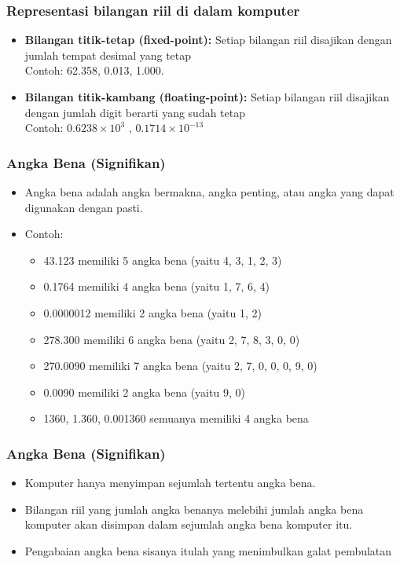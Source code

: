 \documentclass[pdflatex,compress]{beamer}
\begin{document}
\begin{frame}
	\frametitle{Representasi bilangan riil di dalam komputer}
	\begin{itemize}
		\item \textbf{Bilangan titik-tetap (fixed-point):} Setiap bilangan riil disajikan dengan jumlah tempat desimal yang tetap\\
		Contoh: 62.358, 0.013, 1.000.
		\item \textbf{Bilangan titik-kambang (floating-point):} Setiap bilangan riil disajikan dengan jumlah digit berarti yang sudah tetap\\
		Contoh: $0.6238 \times 10^3$ , $0.1714 \times 10^{-13}$
	\end{itemize}
\end{frame}

\begin{frame}
	\frametitle{Angka Bena (Signifikan)}
	\begin{itemize}
		\item Angka bena adalah angka bermakna, angka penting, atau angka yang dapat digunakan dengan pasti.
		\item Contoh:
		\begin{itemize}
			\item[] 43.123 memiliki 5 angka bena (yaitu 4, 3, 1, 2, 3)
			\item[]0.1764 memiliki 4 angka bena (yaitu 1, 7, 6, 4)
			\item[] 0.0000012 memiliki 2 angka bena (yaitu 1, 2)
			\item[] 278.300 memiliki 6 angka bena (yaitu 2, 7, 8, 3, 0, 0)
			\item[] 270.0090 memiliki 7 angka bena (yaitu 2, 7, 0, 0, 0, 9, 0)
			\item[] 0.0090 memiliki 2 angka bena (yaitu 9, 0)
			\item[] 1360, 1.360, 0.001360 semuanya memiliki 4 angka bena
		\end{itemize}
	\end{itemize}
\end{frame}

\begin{frame}
	\frametitle{Angka Bena (Signifikan)}
	\begin{itemize}
		\item Komputer hanya menyimpan sejumlah tertentu angka bena.
		\item Bilangan riil yang jumlah angka benanya melebihi jumlah angka bena komputer akan disimpan dalam sejumlah angka bena komputer itu.
		\item Pengabaian angka bena sisanya itulah yang menimbulkan galat pembulatan
	\end{itemize}
\end{frame}
\end{document}
